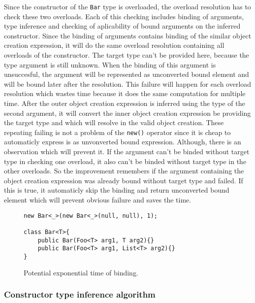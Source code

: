 Since the constructor of the \texttt{Bar} type is overloaded, the overload resolution has to check these two overloads.
Each of this checking includes binding of arguments, type inference and checking of aplicability of bound arguments on the inferred constructor.
Since the binding of arguments contains binding of the similar object creation expression, it will do the same overload resolution containing all overloads of the constructor.
The target type can't be provided here, because the type argument is still unknown.
When the binding of this argument is unsuccesful, the argument will be represented as unconverted bound element and will be bound later after the resolution.
This failure will happen for each overload resolution which wastes time because it does the same computation for multiple time.
After the outer object creation expression is inferred using the type of the second argument, it will convert the inner object creation expression be providing the target type and which will resolve in the valid object creation.
These repeating failing is not a problem of the \texttt{new()} operator since it is cheap to automaticly express is as unvonverted bound expression.
Although, there is an observation which will prevent it.
If the argument can't be binded without target type in checking one overload, it also can't be binded without target type in the other overloads.
So the improvement remembers if the argument containing the object creation expression was already bound without target type and failed. 
If this is true, it automaticly skip the binding and return unconverted bound element which will prevent obvious failure and saves the time.  
\begin{figure}[h!]
\begin{lstlisting}[style=csharp, mathescape=true]
new Bar<_>(new Bar<_>(null, null), 1);

class Bar<T>{
    public Bar(Foo<T> arg1, T arg2){}
    public Bar(Foo<T> arg1, List<T> arg2){}
}
\end{lstlisting}
\caption{Potential exponential time of binding.}
\label{img61:exp}
\end{figure}

\subsubsection*{Constructor type inference algorithm}


